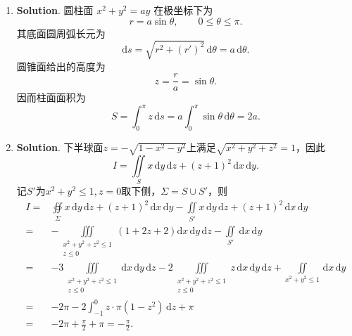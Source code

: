 \documentclass[../main.tex]{subfiles}
\begin{document}
\begin{enumerate}
  \item \textbf{Solution}. 圆柱面 \(x^2+y^2=ay\) 在极坐标下为
        \[
          r=a\sin\theta,\qquad 0\le \theta\le \pi.
        \]
        其底面圆周弧长元为
        \[
          \mathrm{d}s=\sqrt{r^2+(r')^2}\,\mathrm{d}\theta=a\,\mathrm{d}\theta.
        \]
        圆锥面给出的高度为
        \[
          z=\frac{r}{a}=\sin\theta.
        \]
        因而柱面面积为
        \[
          S=\int_0^\pi z\,\mathrm{d}s
          =a\int_0^\pi\sin\theta\,\mathrm{d}\theta
          =2a.
        \]

  \item \textbf{Solution}. 下半球面$z=-\sqrt{1-x^2-y^2}$上满足$\sqrt{x^2+y^2+z^2}=1$，因此
        \[
          I=\iint\limits_S x\,\mathrm{d}y\,\mathrm{d}z+(z+1)^2\,\mathrm{d}x\,\mathrm{d}y.
        \]
        记$S'$为$x^2+y^2\leq 1,z=0$取下侧，$\Sigma = S\cup S'$，则
        \[
          \begin{aligned}
            I= {} & \oiint\limits_{\Sigma}x\,\mathrm{d}y\,\mathrm{d}z+(z+1)^2\,\mathrm{d}x\,\mathrm{d}y-\iint\limits_{S'}x\,\mathrm{d}y\,\mathrm{d}z+(z+1)^2\,\mathrm{d}x\,\mathrm{d}y                                                                                 \\
            = {}  & -\iiint\limits_{\substack{x^2+y^2+z^2\leq 1\\z\leq0}}(1+2z+2) \mathrm{d}x\,\mathrm{d}y\,\mathrm{d}z-\iint\limits_{S'}\,\mathrm{d}x\,\mathrm{d}y                                                                                                    \\
            = {}  & -3\iiint\limits_{\substack{x^2+y^2+z^2\leq 1\\z\leq0}} \mathrm{d}x\,\mathrm{d}y\,\mathrm{d}z-2\iiint\limits_{\substack{x^2+y^2+z^2\leq 1\\z\leq0}} z\,\mathrm{d}x\,\mathrm{d}y\,\mathrm{d}z+\iint\limits_{x^2+y^2\leq 1}\,\mathrm{d}x\,\mathrm{d}y \\
            = {}  & -2\pi-2\int_{-1}^{0} z\cdot \pi(1-z^2)\,\mathrm{d}z+\pi                                                                                                                                                                                            \\
            = {}  & -2\pi+\frac{\pi}{2}+\pi=-\frac{\pi}{2}.
          \end{aligned}
        \]


\end{enumerate}
\end{document}

